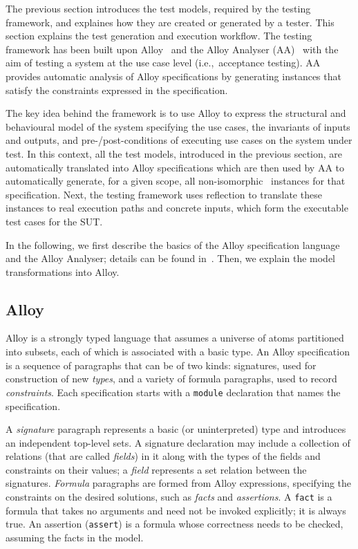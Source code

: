 %
%
\label{sec:test-generation-execution}
The previous section introduces the test models, required by the testing framework, and explaines how they are created or generated by a tester. This section explains the test generation and execution workflow. The testing framework has been built upon Alloy~\cite{Jackson2002} and the Alloy Analyser (AA)~\cite{Jackson2000} with the aim of testing a system at the use case level (i.e.,\ acceptance testing). AA provides automatic analysis of Alloy specifications by generating instances that satisfy the constraints expressed in the specification.

The key idea behind the framework is to use Alloy to express the structural and behavioural model of the system specifying the use cases, the invariants of inputs and outputs, and pre-/post-conditions of executing use cases on the system under test. In this context, all the test models, introduced in the previous section, are automatically translated into Alloy specifications which are then used by AA to automatically generate, for a given scope, all non-isomorphic~\cite{Shlyakhter2007} instances for that specification. Next, the testing framework uses reflection to translate these instances to real execution paths and concrete inputs, which form the executable test cases for the SUT.

In the following, we first describe the basics of the Alloy specification language and the Alloy Analyser; details can be found in~\cite{Jackson2000,Jackson2002,Jackson2012}. Then, we explain the model transformations into Alloy.

\subsection{Alloy}
\label{sec:test-generation-execution-alloy}
Alloy is a strongly typed language that assumes a universe of atoms partitioned into subsets, each of which is associated with a basic type. An Alloy specification is a sequence of paragraphs that can be of two kinds: signatures, used for construction of new \textit{types}, and a variety of formula paragraphs, used to record \textit{constraints}. Each specification starts with a \texttt{module} declaration that names the specification.%

A \textit{signature} paragraph represents a basic (or uninterpreted) type and introduces an independent top-level sets. A signature declaration may include a collection of relations (that are called \textit{fields}) in it along with the types of the fields and constraints on their values; a \textit{field} represents a set relation between the signatures. \textit{Formula} paragraphs are formed from Alloy expressions, specifying the constraints on the desired solutions, such as \textit{facts} and \textit{assertions}. A \texttt{fact} is a formula that takes no arguments and need not be invoked explicitly; it is always true. An assertion (\texttt{assert}) is a formula whose correctness needs to be checked, assuming the facts in the model. 

